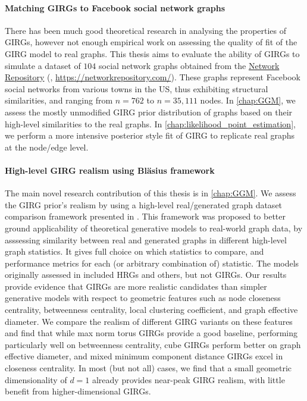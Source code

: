 \paragraph{Matching GIRGs to Facebook social network graphs} There has been much good theoretical research in analysing the properties of GIRGs, however not enough empirical work on assessing the quality of fit of the GIRG model to real graphs. This thesis aims to evaluate the ability of GIRGs to simulate a dataset of $104$ social network graphs obtained from the \href{https://networkrepository.com/}{Network Repository} (\cite{rossi2015network}, \url{https://networkrepository.com/}). These graphs represent Facebook social networks from various towns in the US, thus exhibiting structural similarities, and ranging from $n=762$ to $n=35,111$ nodes.
In \cref{chap:GGM}, we assess the mostly unmodified GIRG prior distribution of graphs based on their high-level similarities to the real graphs. In \cref{chap:likelihood_point_estimation}, we perform a more intensive posterior style fit of GIRG to replicate real graphs at the node/edge level.

\paragraph{High-level GIRG realism using Bl{\"a}sius framework} The main novel research contribution of this thesis is in \cref{chap:GGM}. We assess the GIRG prior's realism by using a high-level real/generated graph dataset comparison framework presented in \cite{blasius2018towards}.
This framework was proposed to better ground applicability of theoretical generative models to real-world graph data, by asssessing similarity between real and generated graphs in different high-level graph statistics.
It gives full choice on which statistics to compare, and performance metrics for each (or arbitrary combination of) statistic.
The models originally assessed in \cite{blasius2018towards} included HRGs and others, but not GIRGs.
Our results provide evidence that GIRGs are more realistic candidates than simpler generative models with respect to geometric features such as node closeness centrality, betweenness centrality, local clustering coefficient, and graph effective diameter.
We compare the realism of different GIRG variants on these features and find that while max norm torus GIRGs provide a good baseline, performing particularly well on betweenness centrality, cube GIRGs perform better on graph effective diameter, and mixed minimum component distance GIRGs excel in closeness centrality.
In most (but not all) cases, we find that a small geometric dimensionality of $d=1$ already provides near-peak GIRG realism, with little benefit from higher-dimensional GIRGs.

